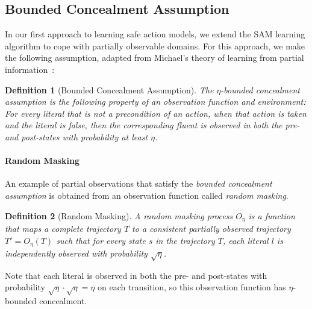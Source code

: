 \documentclass[letterpaper]{article} %
\newtheorem{definition}{Definition}
\begin{document}
\subsection{Bounded Concealment Assumption}

In our first approach to learning safe action models, we extend the SAM learning algorithm \cite{juba2021safe} to cope with partially observable domains. For this approach, we make the following assumption, adapted from Michael's theory of learning from partial information~\cite{michael2010partialObservability}:

\begin{definition}[Bounded Concealment Assumption]
The {\em $\eta$-bounded concealment assumption} is the following property of an observation function and environment:
For every literal that is not a precondition of an action, when that action is taken and the literal is false, then the corresponding fluent is observed in both the pre- and post-states with probability at least $\eta$.
\end{definition}

\paragraph{Random Masking}
An example of partial observations that satisfy the \textit{bounded concealment assumption} is obtained from an observation function called \textit{random masking}.
\begin{definition}[Random Masking]
A random masking process $O_\eta$ is a function that maps a complete trajectory $T$ to a consistent partially observed trajectory $T' = O_{\eta}(T)$ such that for every state $s$ in the trajectory $T$, each literal $l$ is independently observed with probability $\sqrt{\eta}$. 
\end{definition}
\noindent
Note that each literal is observed in both the pre- and post-states with probability $\sqrt{\eta}\cdot\sqrt{\eta}=\eta$ on each transition, so this observation function has $\eta$-bounded concealment.
\end{document}

